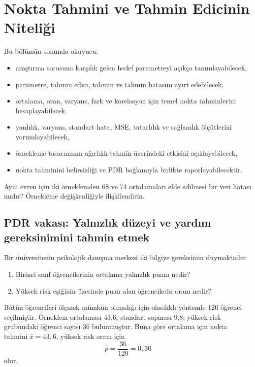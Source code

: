 \chapter{Nokta Tahmini ve Tahmin Edicinin Niteliği}

\begin{hedefler}
Bu bölümün sonunda okuyucu:
\begin{itemize}
  \item araştırma sorusuna karşılık gelen hedef parametreyi açıkça tanımlayabilecek,
  \item parametre, tahmin edici, tahmin ve tahmin hatasını ayırt edebilecek,
  \item ortalama, oran, varyans, fark ve korelasyon için temel nokta tahminlerini hesaplayabilecek,
  \item yanlılık, varyans, standart hata, MSE, tutarlılık ve sağlamlık ölçütlerini yorumlayabilecek,
  \item örnekleme tasarımının ağırlıklı tahmin üzerindeki etkisini açıklayabilecek,
  \item nokta tahminini belirsizliği ve PDR bağlamıyla birlikte raporlayabilecektir.
\end{itemize}
\end{hedefler}

\begin{hazirlik}
Aynı evren için iki örneklemden 68 ve 74 ortalamaları elde edilmesi bir veri
hatası mıdır? Örnekleme değişkenliğiyle ilişkilendirin.
\end{hazirlik}

\section{PDR vakası: Yalnızlık düzeyi ve yardım gereksinimini tahmin etmek}

Bir üniversitenin psikolojik danışma merkezi iki bilgiye gereksinim duymaktadır:

\begin{enumerate}
  \item Birinci sınıf öğrencilerinin ortalama yalnızlık puanı nedir?
  \item Yüksek risk eşiğinin üzerinde puan alan öğrencilerin oranı nedir?
\end{enumerate}

Bütün öğrencileri ölçmek mümkün olmadığı için olasılıklı yöntemle 120 öğrenci
seçilmiştir. Örneklem ortalaması 43,6, standart sapması 9,8; yüksek risk
grubundaki öğrenci sayısı 36 bulunmuştur. Buna göre ortalama için nokta tahmini
$\bar{x}=43{,}6$, yüksek risk oranı için
\[
\hat p=\frac{36}{120}=0{,}30
\]
olur.

